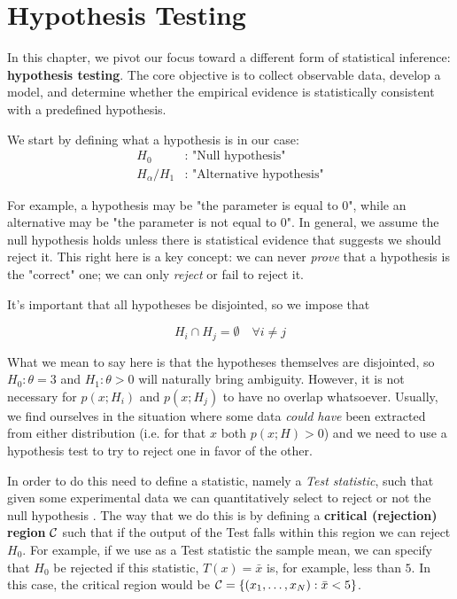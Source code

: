 \chapter{Hypothesis Testing}
In this chapter, we pivot our focus toward a different form of statistical inference: \textbf{hypothesis testing}. The core objective is to collect observable data, develop a model, and determine whether the empirical evidence is statistically consistent with a predefined hypothesis.

We start by defining what a hypothesis is in our case:
	\begin{align*}
	H_0&:\text{ "Null hypothesis"}\\
	H_\alpha/H_1&:\text{ "Alternative hypothesis"}	
	\end{align*}

For example, a hypothesis may be "the parameter is equal to $0$", while an alternative may be "the parameter is not equal to $0$". In general, we assume the null hypothesis holds unless there is statistical evidence that suggests we should reject it. This right here is a key concept: we can never \emph{prove} that a hypothesis is the "correct" one; we can only \emph{reject} or fail to reject it.

It's important that all hypotheses be disjointed, so we impose that

\[
H_i\cap H_j = \emptyset \quad \forall i\neq j
\]

What we mean to say here is that the hypotheses themselves are disjointed, so $H_0:\theta=3$ and $H_1:\theta>0$ will naturally bring ambiguity. However, it is not necessary for $p(x;H_i)$ and $p(x;H_j)$ to have no overlap whatsoever. Usually, we find ourselves in the situation where some data \emph{could have} been extracted from either distribution (i.e. for that $x$ both $p(x;H)>0$) and we need to use a hypothesis test to try to reject one in favor of the other.

In order to do this need to define a statistic, namely a \emph{Test statistic}, such that given some experimental data we can quantitatively select to reject or not the null hypothesis \cite{casella2002statistical}. The way that we do this is by defining a \textbf{critical (rejection) region} $\mathcal{C}$ such that if the output of the Test falls within this region we can reject $H_0$. For example, if we use as a Test statistic the sample mean, we can specify that $H_0$ be rejected if this statistic, $T(x)=\bar{x}$ is, for example, less than $5$. In this case, the critical region would be $\mathcal{C}=\{\left(x_1,\dots,x_N\right):\bar{x}<5\}$.  

